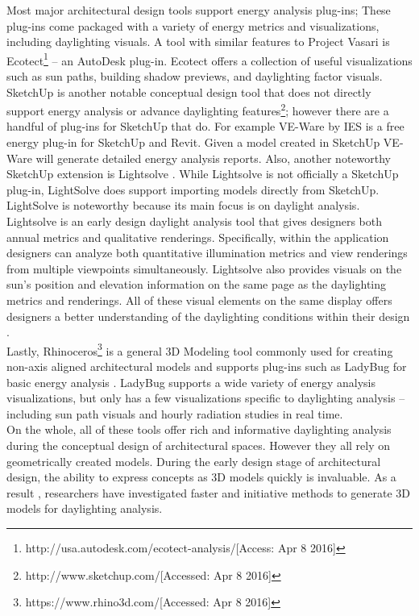 Most major architectural design tools support energy analysis plug-ins; These plug-ins come packaged with a variety of energy metrics and visualizations, including daylighting visuals.  A tool with similar features to Project Vasari is Ecotect\footnote{http://usa.autodesk.com/ecotect-analysis/[Access: Apr 8 2016]} -- an AutoDesk plug-in.  Ecotect offers a collection of useful visualizations such as sun paths, building shadow previews, and daylighting factor visuals. \\

SketchUp is another notable conceptual design tool that does not directly support energy analysis or advance daylighting features\footnote{http://www.sketchup.com/[Accessed: Apr 8 2016]}; however there are a handful of plug-ins for SketchUp that do.  For example VE-Ware by IES is a free energy plug-in for SketchUp and Revit.  Given a model created in SketchUp VE-Ware will generate detailed energy analysis reports.  Also, another noteworthy SketchUp extension is Lightsolve \cite{andersen2008intuitive}.  While Lightsolve is not officially a SketchUp plug-in, LightSolve does support importing models directly from SketchUp.  LightSolve is noteworthy because its main focus is on daylight analysis.  Lightsolve is an early design daylight analysis tool that gives designers both annual metrics and qualitative renderings.  Specifically, within the application designers can analyze both quantitative illumination metrics and view renderings from multiple viewpoints simultaneously.  Lightsolve also provides visuals on the sun's position and elevation information on the same page as the daylighting metrics and renderings.  All of these visual elements on the same display offers designers a better understanding of the daylighting conditions within their design \cite{andersen2011informing}. \\ 

Lastly, Rhinoceros\footnote{https://www.rhino3d.com/[Accessed: Apr 8 2016]} is a general 3D Modeling tool commonly used for creating non-axis aligned architectural models and supports plug-ins such as LadyBug for basic energy analysis \cite{ladybug}.  LadyBug supports a wide variety of energy analysis visualizations, but only has a few visualizations specific to daylighting analysis -- including sun path visuals and hourly radiation studies in real time. \\ %

On the whole, all of these tools offer rich and informative daylighting analysis during the conceptual  design of architectural spaces.  However they all rely on geometrically created models.  During the early design stage of architectural design, the ability to express concepts as 3D models quickly is invaluable.  As a result , researchers have investigated faster and initiative methods to generate 3D models for daylighting analysis.  \\


